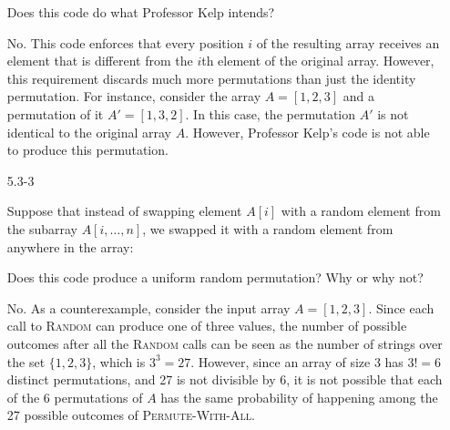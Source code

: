 \documentclass{report}
\makeatletter
\renewenvironment{framed}{%
 \def\FrameCommand##1{\hskip\@totalleftmargin
 \fboxsep=\FrameSep\fbox{##1}}%
 \MakeFramed {\advance\hsize-\width
   \@totalleftmargin\z@ \linewidth\hsize
   \@setminipage}}%
 {\par\unskip\endMakeFramed}
\makeatother
\begin{document}
\begin{enumerate}
{\begin{algorithm}[H]
\SetAlgoNoEnd\DontPrintSemicolon
\BlankLine
{}
\end{algorithm}

Does this code do what Professor Kelp intends?
}

\begin{framed}
No. This code enforces that every position $i$ of the resulting array receives
an element that is different from the $i$th element of the original array.
However, this requirement discards much more permutations than just the identity
permutation. For instance, consider the array $A = [1, 2, 3]$ and a permutation
of it $A' = [1, 3, 2]$. In this case, the permutation $A'$ is not identical
to the original array $A$. However, Professor Kelp's code is not able to produce
this permutation.
\end{framed}

\item[5.3{-}3]{Suppose that instead of swapping element $A[i]$ with a random
element from the subarray $A[i, \dots, n]$, we swapped it with a random element
from anywhere in the array:

\begin{algorithm}[H]
\SetAlgoNoEnd\DontPrintSemicolon
\BlankLine
{}
\end{algorithm}

Does this code produce a uniform random permutation? Why or why not?
}

\begin{framed}
No. As a counterexample, consider the input array $A = [1, 2, 3]$. Since each
call to \textsc{Random} can produce one of three values, the number of possible
outcomes after all the \textsc{Random} calls can be seen as the number of
strings over the set $\{1, 2, 3\}$, which is $3^3 = 27$. However, since an array
of size $3$ has $3! = 6$ distinct permutations, and 27 is not divisible by 6, it
is not possible that each of the 6 permutations of $A$ has the same probability
of happening among the 27 possible outcomes of \textsc{Permute-With-All}.
\end{framed}


\end{enumerate}
\end{document}
